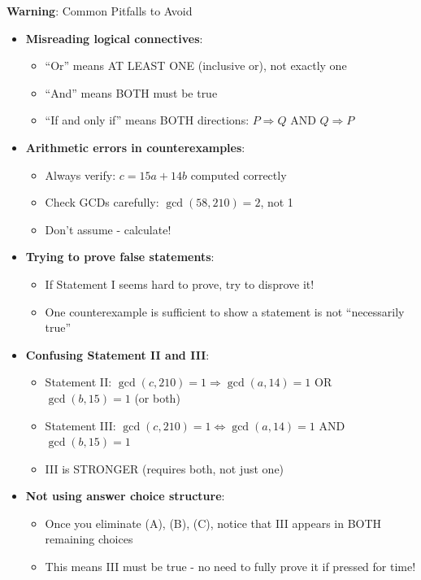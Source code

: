 \documentclass[12pt]{article}
\begin{document}
\begin{warningbox}
\textbf{Warning}: Common Pitfalls to Avoid

\begin{itemize}
    \item \textbf{Misreading logical connectives}: 
    \begin{itemize}
        \item ``Or'' means AT LEAST ONE (inclusive or), not exactly one
        \item ``And'' means BOTH must be true
        \item ``If and only if'' means BOTH directions: $P \Rightarrow Q$ AND $Q \Rightarrow P$
    \end{itemize}
    
    \item \textbf{Arithmetic errors in counterexamples}: 
    \begin{itemize}
        \item Always verify: $c = 15a + 14b$ computed correctly
        \item Check GCDs carefully: $\gcd(58, 210) = 2$, not 1
        \item Don't assume - calculate!
    \end{itemize}
    
    \item \textbf{Trying to prove false statements}: 
    \begin{itemize}
        \item If Statement I seems hard to prove, try to disprove it!
        \item One counterexample is sufficient to show a statement is not ``necessarily true''
    \end{itemize}
    
    \item \textbf{Confusing Statement II and III}: 
    \begin{itemize}
        \item Statement II: $\gcd(c,210)=1 \Rightarrow \gcd(a,14)=1$ OR $\gcd(b,15)=1$ (or both)
        \item Statement III: $\gcd(c,210)=1 \Leftrightarrow \gcd(a,14)=1$ AND $\gcd(b,15)=1$
        \item III is STRONGER (requires both, not just one)
    \end{itemize}
    
    \item \textbf{Not using answer choice structure}: 
    \begin{itemize}
        \item Once you eliminate (A), (B), (C), notice that III appears in BOTH remaining choices
        \item This means III must be true - no need to fully prove it if pressed for time!
    \end{itemize}
    

\end{itemize}
\end{warningbox}
\end{document}
